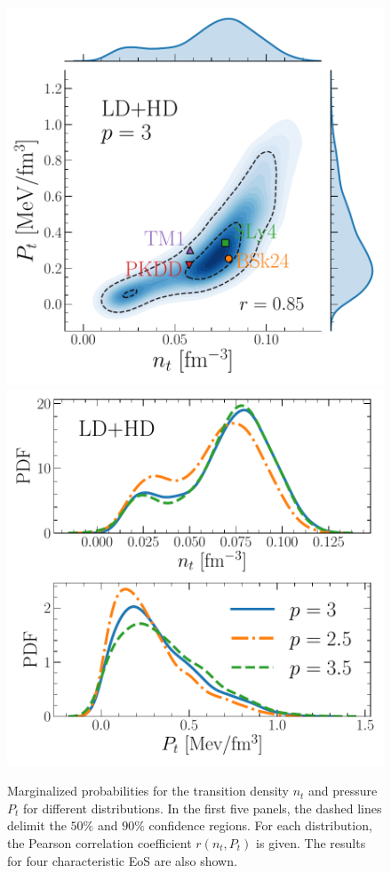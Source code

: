 \begin{figure}[!t]
\begin{center}
    \includegraphics[width=0.42\linewidth]{figures/ntpt_ldhdp3.pdf}
    \includegraphics[width=0.42\linewidth]{figures/ntpt_marg.pdf}
  \end{center}
  \caption[Marginalized probability distributions for the crust-core transition 
  density and pressure for different filters]{Marginalized probabilities for 
    the transition density $n_t$ and pressure $P_t$ for different 
    distributions. In the first five panels, the dashed lines delimit the 
    $50\%$ and $90\%$ confidence regions. For each distribution, the Pearson 
    correlation coefficient $r(n_t,P_t)$ is given. The results for four 
    characteristic EoS are also shown.}\label{fig:ntpt}
\end{figure}

